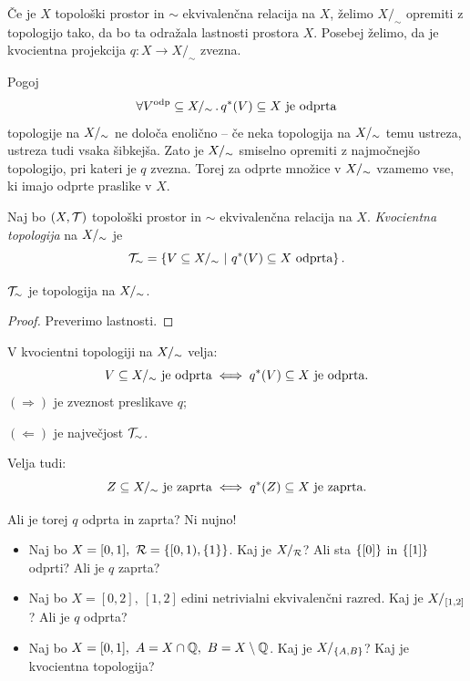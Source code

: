 Če je \(X\) topološki prostor in \(\sim\) ekvivalenčna relacija na \(X\), želimo \(X/_\sim\) opremiti z topologijo tako, da bo ta odražala lastnosti prostora \(X\). Posebej želimo, da je kvocientna projekcija \(q: X \to X/_\sim\) zvezna.

Pogoj \[\forall V^{\text{odp}} \subseteq {X/_\sim} \,.\, q^{*}(V) \subseteq X \ \text{je odprta}\] topologije na \({X/_\sim}\) ne določa enolično -- če neka topologija na \({X/_\sim}\) temu ustreza, ustreza tudi vsaka šibkejša. Zato je \({X/_\sim}\) smiselno opremiti z najmočnejšo topologijo, pri kateri je \(q\) zvezna. Torej za odprte množice v \({X/_\sim}\) vzamemo vse, ki imajo odprte praslike v \(X\).

\begin{definicija}
    Naj bo \((X, \mathcal{T})\) topološki prostor in \(\sim\) ekvivalenčna relacija na \(X\).
    \emph{Kvocientna topologija} na \({X/_\sim}\) je \[\mathcal{T}_\sim = \left\{V \subseteq {X/_\sim} \ | \ q^{*}(V) \subseteq X \ \text{odprta}\right\}.\]
    
\end{definicija}

\begin{trditev}
    \(\mathcal{T}_\sim\) je topologija na \({X/_\sim}\).
\end{trditev}

\begin{proof}
    Preverimo lastnosti.
\end{proof}

\begin{opomba}
    V kvocientni topologiji na \({X/_\sim}\) velja:
    \[V \subseteq {X/_\sim} \ \text{je odprta} \iff q^{*}(V) \subseteq X \ \text{je odprta}.\]
    \((\Rightarrow)\) je zveznost preslikave \(q\);

    \((\Leftarrow)\) je največjost \(\mathcal{T}_\sim\).

    Velja tudi: 
    \[Z \subseteq \qs{X} \ \text{je zaprta} \liff \invimg{q}(Z) \subseteq X \ \text{je zaprta}.\]
\end{opomba}

\begin{primer}
    Ali je torej \(q\) odprta in zaprta? Ni nujno!
    \begin{itemize}
        \item Naj bo \(X = [0,1], \ \mathcal{R} = \left\{[0, 1), \left\{1\right\}\right\}\). Kaj je \(X/_{\mathcal{R}}\)? Ali sta \(\left\{[0]\right\}\) in \(\left\{[1]\right\}\) odprti? Ali je \(q\) zaprta?
        \item Naj bo \(X = [0,2], \ [1, 2] \ \text{edini netrivialni ekvivalenčni razred}\). Kaj je \(X/_{[1, 2]}\)? Ali je \(q\) odprta?
        \item Naj bo \(X = [0, 1], \ A = X \cap \Q, \ B = X \setminus \Q\). Kaj je \(X/_{\left\{A, B\right\}}\)? Kaj je kvocientna topologija?
    \end{itemize}
\end{primer}

